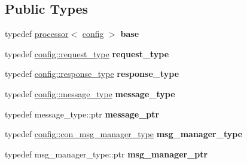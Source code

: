 \subsection*{Public Types}
\begin{DoxyCompactItemize}
\item 
typedef \hyperlink{classwebsocketpp_1_1processor_1_1processor}{processor}$<$ \hyperlink{classconfig}{config} $>$ {\bfseries base}\hypertarget{classwebsocketpp_1_1processor_1_1hybi13_a8153dff44df2368d14f2ecd8473ea064}{}\label{classwebsocketpp_1_1processor_1_1hybi13_a8153dff44df2368d14f2ecd8473ea064}

\item 
typedef \hyperlink{classwebsocketpp_1_1http_1_1parser_1_1request}{config\+::request\+\_\+type} {\bfseries request\+\_\+type}\hypertarget{classwebsocketpp_1_1processor_1_1hybi13_aaf7438e06dfb60da29ef201f8c8cf2dd}{}\label{classwebsocketpp_1_1processor_1_1hybi13_aaf7438e06dfb60da29ef201f8c8cf2dd}

\item 
typedef \hyperlink{classwebsocketpp_1_1http_1_1parser_1_1response}{config\+::response\+\_\+type} {\bfseries response\+\_\+type}\hypertarget{classwebsocketpp_1_1processor_1_1hybi13_a5d918ca9c9aa6c38a145f2ef1d2aa38a}{}\label{classwebsocketpp_1_1processor_1_1hybi13_a5d918ca9c9aa6c38a145f2ef1d2aa38a}

\item 
typedef \hyperlink{classwebsocketpp_1_1message__buffer_1_1message}{config\+::message\+\_\+type} {\bfseries message\+\_\+type}\hypertarget{classwebsocketpp_1_1processor_1_1hybi13_a547b5e5f405468b36b9027f0e973fa15}{}\label{classwebsocketpp_1_1processor_1_1hybi13_a547b5e5f405468b36b9027f0e973fa15}

\item 
typedef message\+\_\+type\+::ptr {\bfseries message\+\_\+ptr}\hypertarget{classwebsocketpp_1_1processor_1_1hybi13_a0571e90d7261ab722f695feb7dd48fed}{}\label{classwebsocketpp_1_1processor_1_1hybi13_a0571e90d7261ab722f695feb7dd48fed}

\item 
typedef \hyperlink{classwebsocketpp_1_1message__buffer_1_1alloc_1_1con__msg__manager}{config\+::con\+\_\+msg\+\_\+manager\+\_\+type} {\bfseries msg\+\_\+manager\+\_\+type}\hypertarget{classwebsocketpp_1_1processor_1_1hybi13_a25a9c3d7a121ae54e064f47a6a7a5931}{}\label{classwebsocketpp_1_1processor_1_1hybi13_a25a9c3d7a121ae54e064f47a6a7a5931}

\item 
typedef msg\+\_\+manager\+\_\+type\+::ptr {\bfseries msg\+\_\+manager\+\_\+ptr}\hypertarget{classwebsocketpp_1_1processor_1_1hybi13_a435c6586650330e0f1685da6b4e70a68}{}\label{classwebsocketpp_1_1processor_1_1hybi13_a435c6586650330e0f1685da6b4e70a68}


\end{DoxyCompactItemize}
